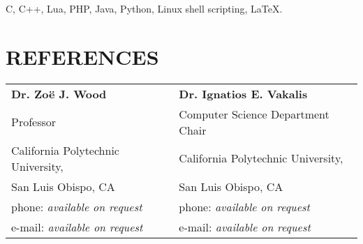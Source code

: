 \documentclass[margin,line]{resume}
\begin{document}
\begin{resume}
    C, C++, Lua, PHP, Java, Python, Linux shell scripting, \LaTeX.


\sectionline

\section{\mysidestyle \textbf{\large{R}\small{EFERENCES}}}

\vspace{1mm} %
\begin{tabular}{@{}p{6cm}p{6cm}}
\textbf{Dr. Zo\"{e} J. Wood}            &  \textbf{Dr. Ignatios E. Vakalis}         \\
Professor                               &  Computer Science Department Chair        \\
California Polytechnic University,      &  California Polytechnic University,       \\
San Luis Obispo, CA                     &  San Luis Obispo, CA                      \\
phone: \textsl{available on request}    &  phone: \textsl{available on request}     \\
e-mail: \textsl{available on request}   &  e-mail: \textsl{available on request}    \\
\end{tabular}

\end{resume}
\end{document}
